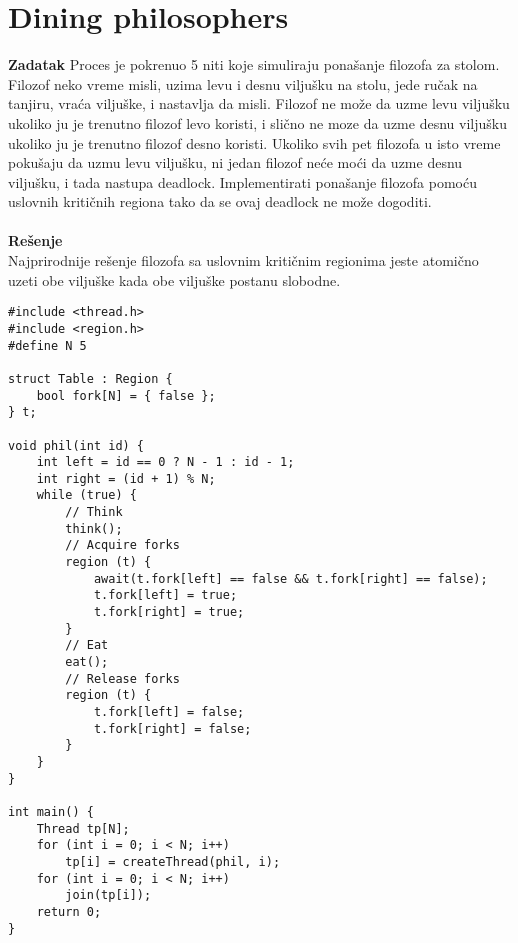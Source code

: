 \clearpage
\section{Dining philosophers}
\textbf{\large Zadatak} Proces je pokrenuo 5 niti koje simuliraju pona\v{s}anje filozofa za stolom. Filozof neko vreme misli, uzima levu i desnu vilju\v{s}ku na stolu, jede ru\v{c}ak na tanjiru, vra\'{c}a vilju\v{s}ke, i nastavlja da misli. Filozof ne mo\v{z}e da uzme levu vilju\v{s}ku ukoliko ju je trenutno filozof levo koristi, i sli\v{c}no ne mo{z}e da uzme desnu vilju\v{s}ku ukoliko ju je trenutno filozof desno koristi. Ukoliko svih pet filozofa u isto vreme poku\v{s}aju da uzmu levu vilju\v{s}ku, ni jedan filozof ne\'{c}e mo\'{c}i da uzme desnu vilju\v{s}ku, i tada nastupa deadlock. Implementirati pona\v{s}anje filozofa pomo\'{c}u uslovnih kriti\v{c}nih regiona tako da se ovaj deadlock ne mo\v{z}e dogoditi.
\\\\
\textbf{\large Re\v{s}enje}\\
Najprirodnije re\v{s}enje filozofa sa uslovnim kriti\v{c}nim regionima jeste atomi\v{c}no uzeti obe vilju\v{s}ke kada obe vilju\v{s}ke postanu slobodne. 
\begin{lstlisting}
#include <thread.h>
#include <region.h>
#define N 5

struct Table : Region {
    bool fork[N] = { false };
} t;

void phil(int id) {
    int left = id == 0 ? N - 1 : id - 1;
    int right = (id + 1) % N;
    while (true) {
        // Think
        think();
        // Acquire forks
        region (t) {
            await(t.fork[left] == false && t.fork[right] == false);
            t.fork[left] = true;
            t.fork[right] = true;
        }
        // Eat
		eat();
        // Release forks
        region (t) {
            t.fork[left] = false;
            t.fork[right] = false;
        }
    }
}

int main() {
    Thread tp[N];
    for (int i = 0; i < N; i++) 
        tp[i] = createThread(phil, i);
    for (int i = 0; i < N; i++) 
        join(tp[i]);
    return 0;
}
\end{lstlisting}